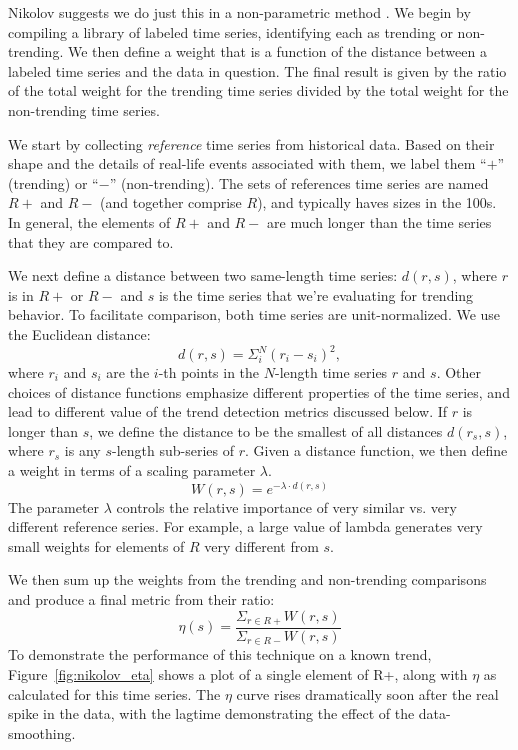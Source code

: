 \documentclass{article}
\begin{document}
Nikolov suggests we do just this in a non-parametric method \cite{Nikolov:2011}. We
begin by compiling a library of labeled time series, identifying each as
trending or non-trending. We then define a weight that is a function of the
distance between a labeled time series and the data in question. The final
result is given by the ratio of the total weight for the trending time series
divided by the total weight for the non-trending time series. 

We start by collecting \textit{reference} time series from historical data. Based on their
shape and the details of real-life events associated with them, we label
them “$+$” (trending) or “$-$” (non-trending). The sets of references time
series are named $R+$ and $R-$ (and together comprise $R$), and typically haves sizes in the 100s. 
In general, the elements of $R+$ and $R-$ are much 
longer than the time series that they are compared to. 

We next define a distance between two same-length time series: $d(r,s)$,
where $r$ is in $R+$ or $R-$ and $s$ is the time series that we’re evaluating for
trending behavior. To facilitate comparison, both time series are unit-normalized. 
We use the Euclidean distance:
\begin{equation}
    d(r,s) = \Sigma_i^N(r_i - s_i)^2,
\end{equation}
where $r_i$ and $s_i$ are the $i$-th points in the $N$-length time series $r$ and $s$. Other
choices of distance functions emphasize different properties of the
time series, and lead to different value of the trend detection metrics
discussed below. If $r$ is longer than $s$, we define the distance to be the
smallest of all distances $d(r_s,s)$, where $r_s$ is any $s$-length sub-series of $r$. Given
a distance function, we then define a weight in terms of a scaling
parameter $\lambda$. 
\begin{equation}
    W(r,s) = e^{-\lambda\cdot d(r,s)}
\end{equation}
The parameter $\lambda$ controls the relative importance of very similar vs. very
different reference series. For example, a large value of lambda generates very
small weights for elements of $R$ very different from $s$. 

We then sum up the weights from the trending and non-trending comparisons and
produce a final metric from their ratio:
\begin{equation}
    \eta(s) = \frac{\Sigma_{r\in R+}W(r,s)}{\Sigma_{r\in R-}W(r,s)} 
\end{equation}
To demonstrate the performance of this technique on a known trend,
Figure~\ref{fig:nikolov_eta} shows a plot of a single element of R+, 
along with $\eta$ as calculated for this time series.
The $\eta$ curve rises dramatically soon after the real spike in the
data, with the lagtime demonstrating the effect of the data-smoothing.
\end{document}
